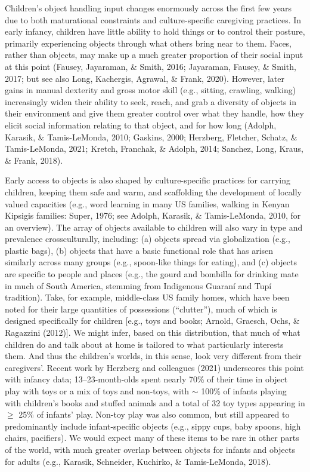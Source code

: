 \documentclass[10pt, letterpaper]{article}
\begin{document}
Children's object handling input changes enormously across the first few
years due to both maturational constraints and culture-specific
caregiving practices. In early infancy, children have little ability to
hold things or to control their posture, primarily experiencing objects
through what others bring near to them. Faces, rather than objects, may
make up a much greater proportion of their social input at this point
(Fausey, Jayaraman, \& Smith, 2016; Jayaraman, Fausey, \& Smith, 2017;
but see also Long, Kachergis, Agrawal, \& Frank, 2020). However, later
gains in manual dexterity and gross motor skill (e.g., sitting,
crawling, walking) increasingly widen their ability to seek, reach, and
grab a diversity of objects in their environment and give them greater
control over what they handle, how they elicit social information
relating to that object, and for how long (Adolph, Karasik, \&
Tamis-LeMonda, 2010; Gaskins, 2000; Herzberg, Fletcher, Schatz, \&
Tamis-LeMonda, 2021; Kretch, Franchak, \& Adolph, 2014; Sanchez, Long,
Kraus, \& Frank, 2018).

Early access to objects is also shaped by culture-specific practices for
carrying children, keeping them safe and warm, and scaffolding the
development of locally valued capacities (e.g., word learning in many US
families, walking in Kenyan Kipsigis families: Super, 1976; see Adolph,
Karasik, \& Tamis-LeMonda, 2010, for an overview). The array of objects
available to children will also vary in type and prevalence
crossculturally, including: (a) objects spread via globalization (e.g.,
plastic bags), (b) objects that have a basic functional role that has
arisen similarly across many groups (e.g., spoon-like things for
eating), and (c) objects are specific to people and places (e.g., the
gourd and bombilla for drinking mate in much of South America, stemming
from Indigenous Guaraní and Tupí tradition). Take, for example,
middle-class US family homes, which have been noted for their large
quantities of possessions (``clutter''), much of which is designed
specifically for children {[}e.g., toys and books; Arnold, Graesch,
Ochs, \& Ragazzini (2012){]}. We might infer, based on this
distribution, that much of what children do and talk about at home is
tailored to what particularly interests them. And thus the children's
worlds, in this sense, look very different from their caregivers'.
Recent work by Herzberg and colleagues (2021) underscores this point
with infancy data; 13--23-month-olds spent nearly 70\% of their time in
object play with toys or a mix of toys and non-toys, with \(\sim\) 100\%
of infants playing with children's books and stuffed animals and a total
of 32 toy types appearing in \(\ge\) 25\% of infants' play. Non-toy play
was also common, but still appeared to predominantly include
infant-specific objects (e.g., sippy cups, baby spoons, high chairs,
pacifiers). We would expect many of these items to be rare in other
parts of the world, with much greater overlap between objects for
infants and objects for adults (e.g., Karasik, Schneider, Kuchirko, \&
Tamis-LeMonda, 2018).
\end{document}
